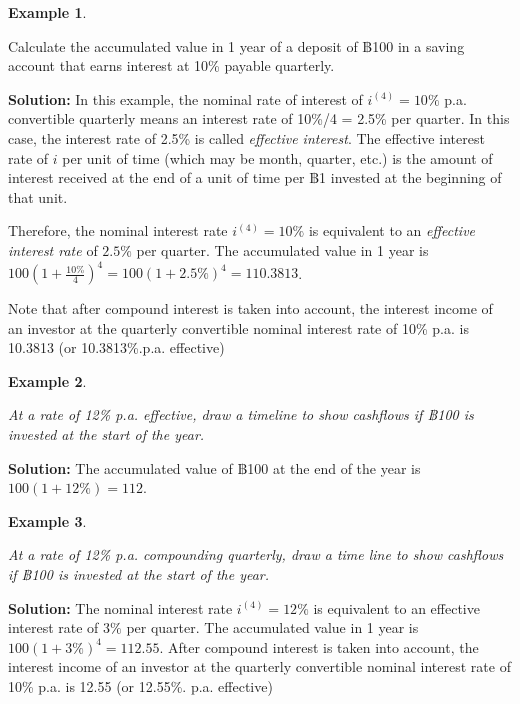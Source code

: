 \documentclass[landscape, 20pt]{extreport}
\theoremstyle{definition}
\theoremstyle{definition}
\newtheorem{example}{Example}[chapter]
\theoremstyle{definition}
\theoremstyle{definition}
\theoremstyle{remark}
\begin{document}
\newpage \begin{example}
\protect\hypertarget{exm:unlabeled-div-5}{}\label{exm:unlabeled-div-5}

Calculate the accumulated value in 1 year of a deposit of ฿100 in a saving account that earns interest at 10\% payable quarterly.

\end{example}

\textbf{Solution:} In this example, the nominal rate of interest of \(i^{(4)} = 10\%\) p.a. convertible
quarterly means an interest rate of 10\%/4 = 2.5\% per quarter. In this case, the interest rate of 2.5\% is called \emph{effective interest}. The effective interest rate of \(i\) per unit of time (which may be month, quarter, etc.) is the amount of interest received at the end of a unit of time per ฿1 invested at the beginning of that unit.

Therefore, the nominal interest rate \(i^{(4)} = 10\%\) is equivalent to an
\emph{effective interest rate} of \(2.5\%\) per quarter.
The accumulated value in
1 year is \(100 (1 + \frac{10\%}{4})^4 = 100 (1 + 2.5\%)^4 = 110.3813\).

Note that after compound interest is
taken into account, the interest income of an investor at the quarterly
convertible nominal interest rate of 10\% p.a. is 10.3813 (or 10.3813\%.p.a. effective)

\newpage \begin{example}
\protect\hypertarget{exm:unlabeled-div-6}{}\label{exm:unlabeled-div-6}

\emph{At a rate of 12\% p.a. effective, draw a timeline to show cashflows if
฿100 is invested at the start of the year.}

\end{example}

\textbf{Solution:} The accumulated value of ฿100 at the end of the year is
\(100 (1 + 12\%) = 112\).

\newpage \begin{example}
\protect\hypertarget{exm:unlabeled-div-7}{}\label{exm:unlabeled-div-7}

\emph{At a rate of 12\% p.a. compounding quarterly, draw a time line to show
cashflows if ฿100 is invested at the start of the year.}

\end{example}

\textbf{Solution:} The nominal interest rate \(i^{(4)} = 12\%\) is equivalent
to an effective interest rate of \(3\%\) per quarter. The accumulated
value in 1 year is \(100 (1 + 3\%)^4 = 112.55\). After compound interest
is taken into account, the interest income of an investor at the
quarterly convertible nominal interest rate of 10\% p.a. is 12.55 (or
12.55\%. p.a. effective)
\end{document}
